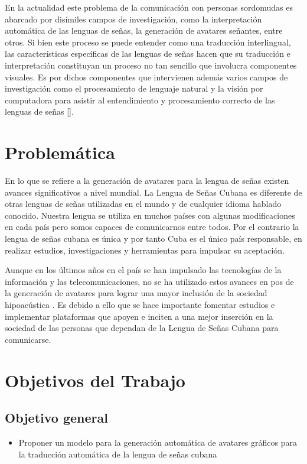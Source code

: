 En la actualidad este problema de la comunicación con personas sordomudas es abarcado por disímiles campos de investigación, como la interpretación automática de las lenguas de señas, la generación de avatares señantes, entre otros. Si bien este proceso
se puede entender como una traducción interlingual, las características  específicas de las lenguas de señas hacen que su traducción e interpretación constituyan un proceso
no tan sencillo que involucra componentes visuales. Es por dichos componentes que intervienen además varios
campos de investigación como el procesamiento de lenguaje natural y la visión por
computadora para asistir al entendimiento y procesamiento correcto de las lenguas de señas [\cite{leynier-lsc-2021}].

\section{Problemática}

En lo que se refiere a la generación de avatares para la lengua de señas existen avances 
significativos a nivel mundial. La Lengua de Señas Cubana es diferente de otras lenguas
de señas utilizadas en el mundo y de cualquier idioma hablado conocido. Nuestra lengua se 
utiliza en muchos países con algunas modificaciones en cada país pero somos capaces de comunicarnos 
entre todos. Por el contrario la lengua de señas cubana es única y por tanto Cuba es el único país responsable, en realizar estudios, investigaciones y herramientas para 
impulsar su aceptación.

Aunque en los últimos años en el país se han impulsado las tecnologías de la información y las 
telecomunicaciones, no se ha utilizado estos avances en pos de la generación de avatares para lograr 
una mayor inclusión de la sociedad hipoacústica . Es debido a ello que se hace importante
fomentar estudios e implementar plataformas que apoyen e inciten a una mejor inserción
en la sociedad de las personas que dependan de la Lengua de Señas Cubana para
comunicarse.

\section{Objetivos del Trabajo}

 
\subsection{Objetivo general}
\begin{itemize}
\item Proponer un modelo para la generación automática de avatares gráficos para la traducción
automática de la lengua de señas cubana

\end{itemize}

